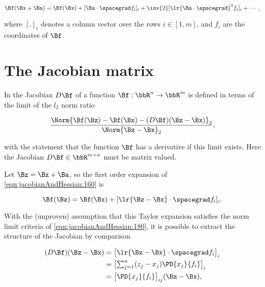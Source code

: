 \begin{equation}\label{eqn:jacobianAndHessian:160}
\Bf(\Bx + \Ba)
= \Bf(\Bx) +
[\Ba \cdot \spacegrad f_i]_i +
\inv{2} [\lr{ \Ba \cdot \spacegrad}^2 f_i]_i + \cdots,
\end{equation}

where \( [.]_i \) denotes a column vector over the rows \( i \in [1,m] \), and \( f_i \) are the coordinates of \( \Bf \).

\section{The Jacobian matrix}

In \citep{boyd2004convex} the Jacobian \( D \Bf \) of a function \( \Bf : \bbR^n \rightarrow \bbR^m \) is defined in terms of the limit of the \( l_2 \) norm ratio

\begin{dmath}\label{eqn:jacobianAndHessian:180}
\frac{\Norm{\Bf(\Bz) - \Bf(\Bx) - (D \Bf) (\Bz - \Bx)}_2 }{ \Norm{\Bz - \Bx}_2 },
\end{dmath}

with the statement that the function \( \Bf \) has a derivative if this limit exists.  Here the Jacobian \( D \Bf \in \bbR^{m \times n} \) must be matrix valued.

Let \( \Bz = \Bx + \Ba \), so the first order expansion of \cref{eqn:jacobianAndHessian:160} is

\begin{dmath}\label{eqn:jacobianAndHessian:200}
\Bf(\Bz)
= \Bf(\Bx) + [\lr{ \Bz - \Bx } \cdot \spacegrad f_i]_i
.
\end{dmath}

With the (unproven) assumption that this Taylor expansion satisfies the norm limit criteria of \cref{eqn:jacobianAndHessian:180}, it is possible to extract the structure of the Jacobian by comparison

\begin{dmath}\label{eqn:jacobianAndHessian:220}
\begin{aligned}
(D \Bf)
(\Bz - \Bx)
&=
{\begin{bmatrix}
\lr{ \Bz - \Bx } \cdot \spacegrad f_i
\end{bmatrix}}_i \\
&=
{\begin{bmatrix}
\sum_{j = 1}^n (z_j - x_j) \PD{x_j}{f_i}
\end{bmatrix}}_i \\
&=
{\begin{bmatrix}
\PD{x_j}{f_i}
\end{bmatrix}}_{ij}
(\Bz - \Bx),
\end{aligned}
\end{dmath}

